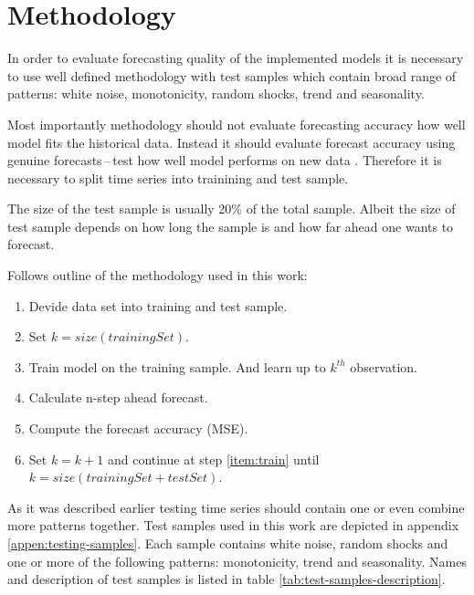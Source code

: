     \section{Methodology} \label{sec:methodology}
    In order to evaluate forecasting quality of the implemented models it is necessary to use well defined
    methodology with test samples which contain broad range of patterns: white noise, monotonicity, random shocks,
    trend and seasonality.

    Most importantly methodology should not evaluate forecasting accuracy how well model
    fits the historical data. Instead it should evaluate forecast accuracy using genuine forecasts\,--\,test 
    how well model performs on new data \cite{otexts}. Therefore it is necessary to split time series into trainining
    and test sample.

    The size of the test sample is usually 20\% of the total sample. Albeit the size of test sample depends on how
    long the sample is and how far ahead one wants to forecast.

    Follows outline of the methodology used in this work:
    \begin{enumerate} \label{enum:methodology}
        \item Devide data set into training and test sample.
        \item Set $k = size(trainingSet)$.
        \item Train model on the training sample. And learn up to $k^{th}$ observation. \label{item:train}
        \item Calculate n-step ahead forecast.
        \item Compute the forecast accuracy (MSE).
        \item Set $k = k+1$ and continue at step \ref{item:train} until $k=size(trainingSet + testSet)$.
    \end{enumerate}

    As it was described earlier testing time series should contain one or even combine more patterns together. Test
    samples used in this work are depicted in appendix \ref{appen:testing-samples}. Each sample contains white noise,
    random shocks and one or more of the following patterns: monotonicity, trend and seasonality. Names and
    description of test samples is listed in table \ref{tab:test-samples-description}.

